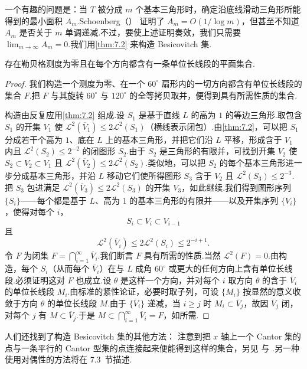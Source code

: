 一个有趣的问题是：当 $T$ 被分成 $m$ 个基本三角形时，确定沿底线滑动三角形所能得到的最小面积 $A_m$.Schoenberg（\citeyear{schoenberg1962a,schoenberg1962b}） 证明了 $A_m=O(1/\log m)$，但甚至不知道 $A_m$ 是否关于 $m$ 单调递减.不过，要使上述证明奏效，我们只需要 $\lim_{m\to\infty}A_m=0$.我们用\cref{thm:7.2} 来构造 Besicovitch 集.

\begin{theorem}\label{thm:7.3}
存在勒贝格测度为零且在每个方向都含有一条单位长线段的平面集合.
\end{theorem}

\begin{proof}
我们构造一个测度为零、在一个 $60^{\circ}$ 扇形内的一切方向都含有单位长线段的集合 $F$.把 $F$ 与其旋转 $60^{\circ}$ 与 $120^{\circ}$ 的全等拷贝取并，便得到具有所需性质的集合.

构造由反复应用\cref{thm:7.2} 组成.设 $S_1$ 是基于直线 $L$ 的高为 $1$ 的等边三角形.取包含 $S_1$ 的开集 $V_1$ 使 $\mathcal{L}^2(\overline{V}_1)\leq 2\mathcal{L}^2(S_1)$（横线表示闭包）.由\cref{thm:7.2}，可以把 $S_1$ 分成若干个高为 $1$、底在 $L$ 上的基本三角形，并把它们沿 $L$ 平移，形成含于 $V_1$ 内且 $\mathcal{L}^2(S_2)\leq 2^{-2}$ 的闭图形 $S_2$.由于 $S_2$ 是三角形的有限并，可找到开集 $V_2$ 使 $S_2\subset V_2\subset V_1$ 且 $\mathcal{L}^2(\overline{V}_2)\leq 2\mathcal{L}^2(S_2)$.类似地，可以把 $S_2$ 的每个基本三角形进一步分成基本三角形，并沿 $L$ 移动它们使所得图形 $S_3$ 含于 $V_2$ 且 $\mathcal{L}^2(S_3)\leq 2^{-3}$.把 $S_3$ 包进满足 $\mathcal{L}^2(\overline{V}_3)\leq 2\mathcal{L}^2(S_3)$ 的开集 $V_3$，如此继续.我们得到图形序列 $\{S_i\}$——每个都是基于 $L$、高为 $1$ 的基本三角形的有限并——以及开集序列 $\{V_i\}$，使得对每个 $i$，
\[
  S_i\subset V_i\subset V_{i-1}
\]
且
\[
  \mathcal{L}^{2}(\bar{V}_i)\leq 2\mathcal{L}^{2}(S_i)\leq 2^{-i+1}.
\]
令 $F$ 为闭集 $F=\bigcap_{i=1}^{\infty}\overline{V}_i$.我们断言 $F$ 具有所需的性质.当然 $\mathscr{L}^2(F)=0$.由构造，每个 $S_i$（从而每个 $\overline{V}_i$）在与 $L$ 成角 $60^{\circ}$ 或更大的任何方向上含有单位长线段.必须证明这对 $F$ 也成立.设 $\theta$ 是这样一个方向，并对每个 $i$ 取方向 $\theta$ 的含于 $\overline{V}_i$ 的单位长线段 $M_i$.由标准的紧性论证，必要时取子列，可设 $\{M_i\}$ 按显然的意义收敛于方向 $\theta$ 的单位长线段 $M$.由于 $\{\overline{V}_i\}$ 递减，当 $i\geq j$ 时 $M_i\subset\overline{V}_j$，故因 $\overline{V}_j$ 闭，对每个 $j$ 有 $M\subset\overline{V}_j$.于是 $M\subset\bigcap_{i=1}^{\infty}\overline{V}_i=F$，如所需.
\end{proof}

人们还找到了构造 Besicovitch 集的其他方法：\textcite{kahane1969} 注意到把 $x$ 轴上一个 Cantor 集的点与一条平行的 Cantor 型集的点连接起来便能得到这样的集合，另见 \textcite{kinney1970} 与 \textcite{alexander1975}.另一种使用对偶性的方法将在 7.3~节描述.

